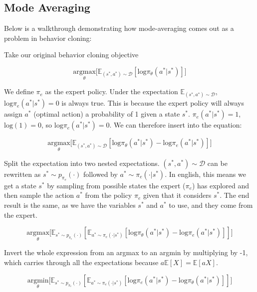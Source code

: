 
\subsection{Mode Averaging}
\begin{flushleft}
    \large Below is a walkthrough demonstrating how mode-averaging comes out as a problem in behavior cloning: \break

    Take our original behavior cloning objective

    $$\underset{\theta}{\textrm{argmax}}\biggl[\mathbb{E}_{(s^*,a^*) \sim \mathcal{D}}[\mathrm{log}\pi_\theta(a^*|s^*)]\biggr]$$

    We define $\pi_e$ as the expert policy. Under the expectation $\mathbb{E}_{(s^*,a^*) \sim \mathcal{D}}$, $\mathrm{log}\pi_e(a^*|s^*) = 0$ is always true. This is because the expert policy will always assign $a^*$ (optimal action) a probability of 1 given a state $s^*$. $\pi_e(a^*|s^*) = 1$, $\mathrm{log}(1) = 0$, so  $\mathrm{log}\pi_e(a^*|s^*) = 0$. We can therefore insert into the equation:

    $$\underset{\theta}{\textrm{argmax}}\biggl[\mathbb{E}_{(s^*,a^*) \sim \mathcal{D}}[\mathrm{log}\pi_\theta(a^*|s^*) - \mathrm{log}\pi_e(a^*|s^*)]\biggr]$$

    Split the expectation into two nested expectations. $(s^*,a^*) \sim \mathcal{D}$ can be rewritten as $s^* \sim p_{\pi_e}(\cdot)$ followed by $a^* \sim \pi_e(\cdot|s^*)$. In english, this means we get a state $s^*$ by sampling from possible states the expert ($\pi_e$) has explored and then sample the action $a^*$ from the policy $\pi_e$ given that it considers $s^*$. The end result is the same, as we have the variables $s^*$ and $a^*$ to use, and they come from the expert.

    $$\underset{\theta}{\textrm{argmax}}\biggl[\mathbb{E}_{s^* \sim p_{\pi_e}(\cdot)}[\mathbb{E}_{a^* \sim \pi_e(\cdot|s^*)}[\mathrm{log}\pi_\theta(a^*|s^*) - \mathrm{log}\pi_e(a^*|s^*)]]\biggr]$$

    Invert the whole expression from an argmax to an argmin by multiplying by -1, which carries through all the expectations because $a\mathbb{E}[X] = \mathbb{E}[aX]$.

    $$\underset{\theta}{\textrm{argmin}}\biggl[\mathbb{E}_{s^* \sim p_{\pi_e}(\cdot)}[\mathbb{E}_{a^* \sim \pi_e(\cdot|s^*)}[\mathrm{log}\pi_e(a^*|s^*) - \mathrm{log}\pi_\theta(a^*|s^*)]]\biggr]$$


\end{flushleft}
